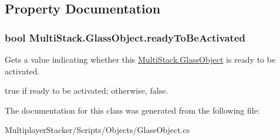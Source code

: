 \subsection{Property Documentation}
\hypertarget{class_multi_stack_1_1_glass_object_a4ab5c37980ecdeea3986f7075c7ea6aa}{}
\subsubsection[{ready\+To\+Be\+Activated}]{\setlength{\rightskip}{0pt plus 5cm}bool Multi\+Stack.\+Glass\+Object.\+ready\+To\+Be\+Activated\hspace{0.3cm}{\ttfamily [get]}}\label{class_multi_stack_1_1_glass_object_a4ab5c37980ecdeea3986f7075c7ea6aa}


Gets a value indicating whether this \hyperlink{class_multi_stack_1_1_glass_object}{Multi\+Stack.\+Glass\+Object} is ready to be activated. 

{\ttfamily true} if ready to be activated; otherwise, {\ttfamily false}.

The documentation for this class was generated from the following file\+:\begin{DoxyCompactItemize}
\item 
Multiplayer\+Stacker/\+Scripts/\+Objects/Glass\+Object.\+cs\end{DoxyCompactItemize}

